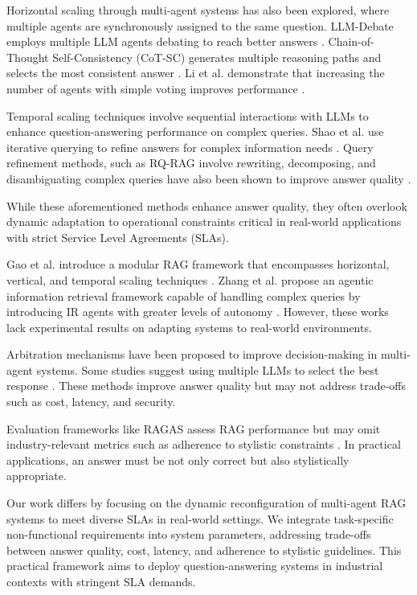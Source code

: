 \documentclass[sigconf,nonacm]{acmart}
\begin{document}
Horizontal scaling through multi-agent systems has also been explored, where multiple agents are synchronously assigned to the same question. LLM-Debate employs multiple LLM agents debating to reach better answers \cite{llm-debate}. Chain-of-Thought Self-Consistency (CoT-SC) generates multiple reasoning paths and selects the most consistent answer \cite{cot-sc}. Li et al. demonstrate that increasing the number of agents with simple voting improves performance \cite{moreagents}.

Temporal scaling techniques involve sequential interactions with LLMs to enhance question-answering performance on complex queries. Shao et al. use iterative querying to refine answers for complex information needs \cite{iterative-retrieval}. Query refinement methods, such as RQ-RAG involve rewriting, decomposing, and disambiguating complex queries have also been shown to improve answer quality \cite{rq-rag}.

While these aforementioned methods enhance answer quality, they often overlook dynamic adaptation to operational constraints critical in real-world applications with strict Service Level Agreements (SLAs).

Gao et al. introduce a modular RAG framework that encompasses horizontal, vertical, and temporal scaling techniques \cite{modular-rag}. Zhang et al. propose an agentic information retrieval framework capable of handling complex queries by introducing IR agents with greater levels of autonomy \cite{agentic-ir}. However, these works lack experimental results on adapting systems to real-world environments.

Arbitration mechanisms have been proposed to improve decision-making in multi-agent systems. Some studies suggest using multiple LLMs to select the best response \cite{PoLL}. These methods improve answer quality but may not address trade-offs such as cost, latency, and security.

Evaluation frameworks like RAGAS assess RAG performance but may omit industry-relevant metrics such as adherence to stylistic constraints \cite{ragas}. In practical applications, an answer must be not only correct but also stylistically appropriate.

Our work differs by focusing on the dynamic reconfiguration of multi-agent RAG systems to meet diverse SLAs in real-world settings. We integrate task-specific non-functional requirements into system parameters, addressing trade-offs between answer quality, cost, latency, and adherence to stylistic guidelines. This practical framework aims to deploy question-answering systems in industrial contexts with stringent SLA demands.
\end{document}

